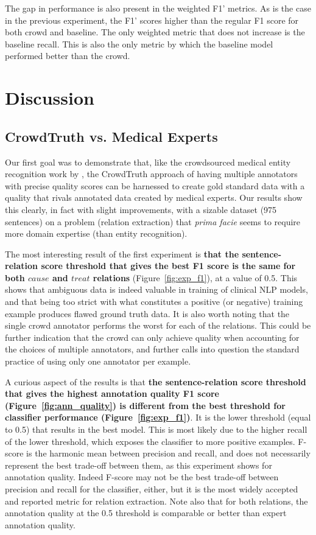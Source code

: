 The gap in performance is also present in the weighted F1' metrics. As is the case in the previous experiment, the F1' scores higher than the regular F1 score for both crowd and baseline. The only weighted metric that does not increase is the baseline recall. This is also the only metric by which the baseline model performed better than the crowd.


\section{Discussion}

\subsection{CrowdTruth vs. Medical Experts}
\label{sec:ct-exp}

Our first goal was to demonstrate that, like the crowdsourced medical entity recognition work by \cite{zhai2013web}, the CrowdTruth approach of having multiple annotators with precise quality scores can be harnessed to create gold standard data with a quality that rivals annotated data created by medical experts.  Our results show this clearly, in fact with slight improvements, with a sizable dataset (975 sentences) on a problem (relation extraction) that {\em prima facie} seems to require more domain expertise (than entity recognition).

The most interesting result of the first experiment is \textbf{that the sentence-relation score threshold that gives the best F1 score is the same for both $cause$ and $treat$ relations} (Figure~\ref{fig:exp_f1}), at a value of 0.5. This shows that ambiguous data is indeed valuable in training of clinical NLP models, and that being too strict with what constitutes a positive (or negative) training example produces flawed ground truth data. It is also worth noting that the single crowd annotator performs the worst for each of the relations. This could be further indication that the crowd can only achieve quality when accounting for the choices of multiple annotators, and further calls into question the standard practice of using only one annotator per example.

A curious aspect of the results is that \textbf{the sentence-relation score threshold that gives the highest annotation quality F1 score (Figure~\ref{fig:ann_quality}) is different from the best threshold for classifier performance (Figure~\ref{fig:exp_f1})}. It is the lower threshold (equal to 0.5) that results in the best model. This is most likely due to the higher recall of the lower threshold, which exposes the classifier to more positive examples.  F-score is the harmonic mean between precision and recall, and does not necessarily represent the best trade-off between them, as this experiment shows for annotation quality.  Indeed F-score may not be the best trade-off between precision and recall for the classifier, either, but it is the most widely accepted and reported metric for relation extraction.  Note also that for both relations, the annotation quality at the 0.5 threshold is comparable or better than expert annotation quality.

